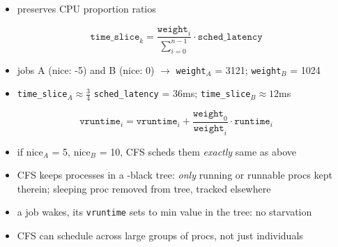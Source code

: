\documentclass[8pt,a4paper,landscape]{extarticle}
\begin{document}
\begin{multicols*}{3}
\begin{minipage}{.34\linewidth}
\begin{itemize}
  \item preserves CPU proportion ratios
  \end{itemize}
\end{minipage}
\vspace{-.3em}
\begin{equation}
  \label{eq:timeslice}
  \texttt{time\_slice}_{k} = \frac{\texttt{weight}_{i}}{\sum_{i=0}^{n-1}}\cdot \texttt{sched\_latency}
\end{equation}
\begin{itemize}
\item jobs A (nice: -5) and B (nice: 0) $\to$ \texttt{weight}$_{A}$ = 3121; \texttt{weight}$_{B}$ = 1024
\item \texttt{time\_slice}$_{A} \approx \frac{3}{4}$ \texttt{sched\_latency} = 36ms; \texttt{time\_slice}$_{B} \approx 12$ms
\end{itemize}
\begin{equation}
  \label{eq:vruntime}
  \texttt{vruntime}_{i} = \texttt{vruntime}_{i} + \frac{\texttt{weight}_{0}}{\texttt{weight}_{i}}\cdot \texttt{runtime}_{i}
\end{equation}
\begin{itemize}
\item if nice$_{A}$ = 5, nice$_{B}$ = 10, CFS scheds them \emph{exactly} same as above
\item CFS keeps processes in a -black tree: \emph{only} running or runnable procs kept therein; sleeping proc removed from tree, tracked elsewhere
\item a job wakes, its \texttt{vruntime} sets to min value in the tree: no starvation
\item CFS can schedule across large groups of procs, not just individuals
\end{itemize}
\end{multicols*}
\end{document}
